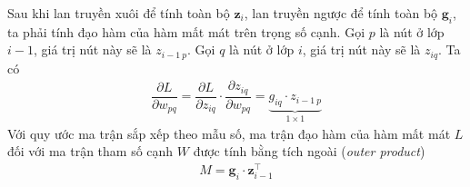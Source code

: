 Sau khi lan truyền xuôi để tính toàn bộ $\mathbf z_i$, lan truyền ngược để tính toàn bộ $\mathbf g_i$, ta phải tính đạo hàm của hàm mất mát trên trọng số cạnh. Gọi $p$ là nút ở lớp $i-1$, giá trị nút này sẽ là $z_{i-1\ p}$. Gọi $q$ là nút ở lớp $i$, giá trị nút này sẽ là $z_{iq}$. Ta có
\begin{align}
    \dfrac{\partial L}{\partial w_{pq}}=\dfrac{\partial L}{\partial z_{iq}}\cdot\dfrac{\partial z_{iq}}{\partial w_{pq}}=\underbrace{g_{iq}\cdot z_{i-1\ p}}_{1\times 1}
\end{align}
Với quy ước ma trận sắp xếp theo mẫu số, ma trận đạo hàm của hàm mất mát $L$ đối với ma trận tham số cạnh $W$ được tính bằng tích ngoài (\textit{outer product}) \cite{Aggarwal2023}
\begin{align}
    M=\mathbf g_i\cdot\mathbf  z_{i-1}^\intercal
\end{align}
